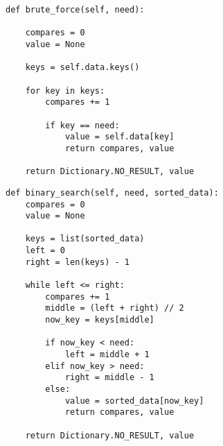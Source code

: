 \begin{center}
\captionsetup{justification=raggedright,singlelinecheck=off}
\begin{lstlisting}[label=lst:brute-force,caption=Полный перебор]
def brute_force(self, need):

    compares = 0
    value = None

    keys = self.data.keys()

    for key in keys:
        compares += 1

        if key == need:
            value = self.data[key]
            return compares, value
        
    return Dictionary.NO_RESULT, value
\end{lstlisting} 
\end{center}
\begin{center}
\captionsetup{justification=raggedright,singlelinecheck=off}
\begin{lstlisting}[label=lst:binary,caption=Бинарный поиск]
def binary_search(self, need, sorted_data):
    compares = 0
    value = None

    keys = list(sorted_data)
    left = 0
    right = len(keys) - 1

    while left <= right:
        compares += 1
        middle = (left + right) // 2
        now_key = keys[middle]

        if now_key < need:
            left = middle + 1
        elif now_key > need:
            right = middle - 1
        else:
            value = sorted_data[now_key]
            return compares, value
        
    return Dictionary.NO_RESULT, value
\end{lstlisting}
\end{center}
